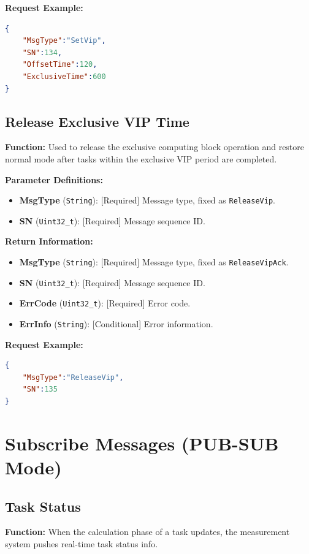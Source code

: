\documentclass[12pt, a4paper]{article}
\begin{document}
\noindent \textbf{Request Example:}
\begin{lstlisting}[language=json]
{
    "MsgType":"SetVip",
    "SN":134,
    "OffsetTime":120,
    "ExclusiveTime":600
}
\end{lstlisting}

\subsection{Release Exclusive VIP Time}

\textbf{Function:} Used to release the exclusive computing block operation and restore normal mode after tasks within the exclusive VIP period are completed.

\textbf{Parameter Definitions:}
\begin{itemize}
    \item \textbf{MsgType} (\texttt{String}): [Required] Message type, fixed as \texttt{ReleaseVip}.
    \item \textbf{SN} (\texttt{Uint32\_t}): [Required] Message sequence ID.
\end{itemize}

\textbf{Return Information:}
\begin{itemize}
    \item \textbf{MsgType} (\texttt{String}): [Required] Message type, fixed as \texttt{ReleaseVipAck}.
    \item \textbf{SN} (\texttt{Uint32\_t}): [Required] Message sequence ID.
    \item \textbf{ErrCode} (\texttt{Uint32\_t}): [Required] Error code.
    \item \textbf{ErrInfo} (\texttt{String}): [Conditional] Error information.
\end{itemize}

\noindent \textbf{Request Example:}
\begin{lstlisting}[language=json]
{
    "MsgType":"ReleaseVip",
    "SN":135
}
\end{lstlisting}


\section{Subscribe Messages (PUB-SUB Mode)}

\subsection{Task Status}

\textbf{Function:} When the calculation phase of a task updates, the measurement system pushes real-time task status info.
\end{document}

